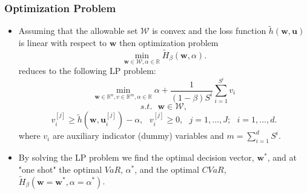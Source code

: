 \documentclass[pdf,10pt,xcolor=dvipsnames,hide notes]{beamer}
\begin{document}
\begin{frame}[label=frame3f]
	\frametitle{Optimization Problem}
	
	\begin{itemize}
		\justifying
		
		\item Assuming that the allowable set $\mathcal{W}$ is convex and the loss
		function $\widetilde{h}\left( \mathbf{w,u}\right) $ is linear with respect to $\mathbf{w}
		$ then optimization problem
		\begin{equation}
		\underset{\mathbf{w}\in \mathcal{W},\alpha \in
			\mathbb{R}
		}{\min }\widetilde{H}_{\beta }\left( \mathbf{w},\alpha \right) .
		\end{equation}%
		reduces to the following LP problem:%
		\begin{equation}
		\underset{\mathbf{w}\in
			\mathbb{R}
			^{n},v\in
			\mathbb{R}
			^{m},\alpha \in
			\mathbb{R}
		}{\min }\alpha +\frac{1}{\left( 1-\beta \right) S^{i}}\sum_{i=1}^{S^{i}}v_{i}
		\end{equation}%
		\begin{equation}
		s.t.\text{ }\mathbf{w}\in \mathcal{W},  \label{set}
		\end{equation}%
		\begin{equation}
		v_{i}^{\left[ j\right] }\geq \widetilde{h}(\mathbf{w},\mathbf{u}_{i}^{[j]})-\alpha ,%
		\text{ }v_{i}^{\left[ j\right] }\geq 0,\text{ }j=1,...,J;\text{ }i=1,...,d.
		\end{equation}%
		where $v_{i}$ are auxiliary indicator (dummy) variables and $%
		m=\sum_{i=1}^{d}S^{i}$. 
		
		\vspace{0.3cm}
		
		\item By solving the LP problem we find the optimal
		decision vector, $\mathbf{w}^{\ast }$, and at "one shot" the optimal $VaR$, $%
		\alpha ^{\ast }$, and the optimal $CVaR$, \\ $\widetilde{H}_{\beta }\left(
		\mathbf{w}=\mathbf{w}^{\ast },\alpha =\alpha ^{\ast }\right) $.
		
		
		\end{itemize}
\end{frame}
\end{document}
